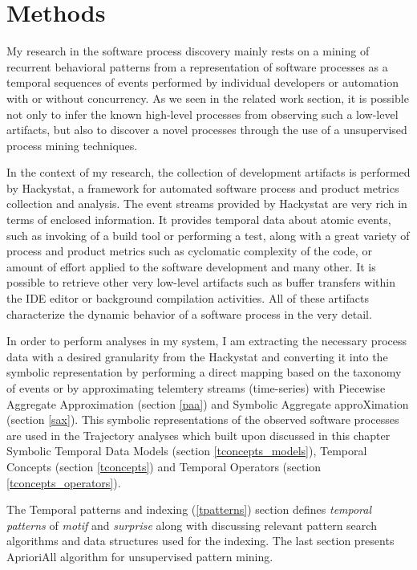 \chapter{Methods} \label{methods}
My research in the software process discovery mainly rests on a mining of recurrent behavioral patterns from a representation of software processes as a temporal sequences of events performed by individual developers or automation with or without concurrency. As we seen in the related work section, it is possible not only to infer the known high-level processes from observing such a low-level artifacts, but also to discover a novel processes through the use of a unsupervised process mining techniques.

In the context of my research, the collection of development artifacts is performed by Hackystat, a framework for automated software process and product metrics collection and analysis. The event streams provided by Hackystat are very rich in terms of enclosed information. It provides temporal data about atomic events, such as invoking of a build tool or performing a test, along with a great variety of process and product metrics such as cyclomatic complexity of the code, or amount of effort applied to the software development and many other. It is possible to retrieve other very low-level artifacts such as buffer transfers within the IDE editor or background compilation activities. All of these artifacts characterize the dynamic behavior of a software process in the very detail.

In order to perform analyses in my system, I am extracting the necessary process data with a desired granularity from the Hackystat and converting it into the symbolic representation by performing a direct mapping based on the taxonomy of events or by approximating telemtery streams (time-series) with Piecewise Aggregate Approximation (section \ref{paa}) and Symbolic Aggregate approXimation (section \ref{sax}). This symbolic representations of the observed software processes are used in the Trajectory analyses which built upon discussed in this chapter Symbolic Temporal Data Models (section \ref{tconcepts_models}), Temporal Concepts (section \ref{tconcepts}) and Temporal Operators (section \ref{tconcepts_operators}). 

The Temporal patterns and indexing (\ref{tpatterns}) section defines \textit{temporal patterns} of \textit{motif} and \textit{surprise} along with discussing relevant pattern search algorithms and data structures used for the indexing. The last section presents AprioriAll algorithm for unsupervised pattern mining.